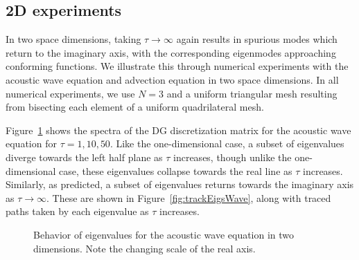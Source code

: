 \documentclass[preprint,10pt]{elsarticle}
\begin{document}
\subsection{2D experiments}

In two space dimensions, taking $\tau\rightarrow \infty$ again results in spurious modes which return to the imaginary axis, with the corresponding eigenmodes approaching conforming functions.  We illustrate this through numerical experiments with the acoustic wave equation and advection equation in two space dimensions.  In all numerical experiments, we use $N=3$ and a uniform triangular mesh resulting from bisecting each element of a uniform quadrilateral mesh.  

Figure~\ref{fig:waveeigs} shows the spectra of the DG discretization matrix for the acoustic wave equation for $\tau = 1, 10, 50$.  Like the one-dimensional case, a subset of eigenvalues diverge towards the left half plane as $\tau$ increases, though unlike the one-dimensional case, these eigenvalues collapse towards the real line as $\tau$ increases.  Similarly, as predicted, a subset of eigenvalues returns towards the imaginary axis as $\tau \rightarrow \infty$.  These are shown in Figure~\ref{fig:trackEigsWave}, along with traced paths taken by each eigenvalue as $\tau$ increases.  

\begin{figure}
\centering
{}
\hspace{.5em}
\hspace{.5em}
\caption{Behavior of eigenvalues for the acoustic wave equation in two dimensions. Note the changing scale of the real axis.}
\label{fig:waveeigs}
\end{figure}
\end{document}
